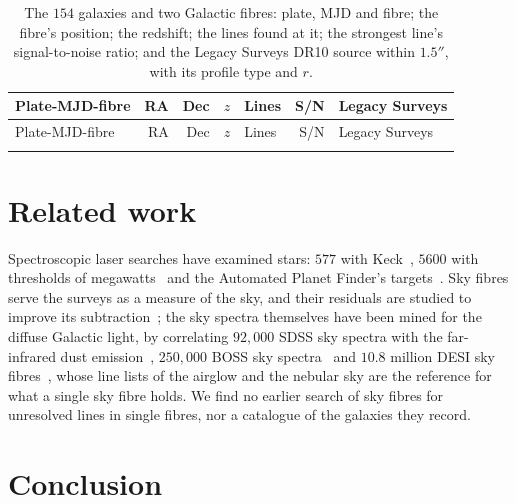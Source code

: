 \documentclass[3p,11pt]{elsarticle}
\begin{document}
\begin{center}\small
\setlength{\tabcolsep}{4pt}
\begin{longtable}{lrrr>{\raggedright\arraybackslash}p{3.9cm}rl}
\caption{The $154$ galaxies and two Galactic fibres: plate, MJD and fibre; the fibre's
position; the redshift; the lines found at it; the strongest line's signal-to-noise
ratio; and the Legacy Surveys DR10 source within $1.5''$, with its profile type and
$r$.}\label{tab:galaxies}\\
\toprule
Plate-MJD-fibre & RA & Dec & $z$ & Lines & S/N & Legacy Surveys \\
\midrule
\endfirsthead
\toprule
Plate-MJD-fibre & RA & Dec & $z$ & Lines & S/N & Legacy Surveys \\
\midrule
\endhead
\bottomrule
\endfoot

\end{longtable}
\end{center}

\section{Related work}\label{sec:related}

Spectroscopic laser searches have examined stars: $577$ with Keck~\cite{ReinesMarcy2002},
$5600$ with thresholds of megawatts~\cite{TellisMarcy2017} and the Automated Planet
Finder's targets~\cite{Zuckerman2023}. Sky fibres serve the surveys as a measure of the
sky, and their residuals are studied to improve its subtraction~\cite{Bolton2012}; the
sky spectra themselves have been mined for the diffuse Galactic light, by correlating
$92{,}000$ SDSS sky spectra with the far-infrared dust emission~\cite{BrandtDraine2012},
$250{,}000$ BOSS sky spectra~\cite{Chellew2022} and $10.8$ million DESI sky
fibres~\cite{Saydjari2026}, whose line lists of the airglow and the nebular sky are the
reference for what a single sky fibre holds. We find no earlier search of sky fibres
for unresolved lines in single fibres, nor a catalogue of the galaxies they record.

\section{Conclusion}\label{sec:conclusion}
\end{document}
